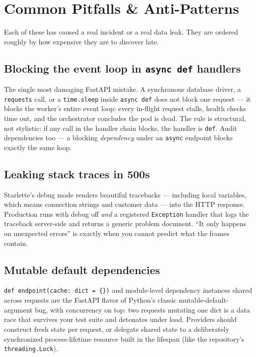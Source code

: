 \section{Common Pitfalls \& Anti-Patterns}
\label{sec:ch6-pitfalls}

Each of these has caused a real incident or a real data leak. They are
ordered roughly by how expensive they are to discover late.

\subsection*{Blocking the event loop in \texttt{async def} handlers}
The single most damaging FastAPI mistake. A synchronous database driver, a
\texttt{requests} call, or a \texttt{time.sleep} inside \texttt{async def}
does not block one request --- it blocks the worker's entire event loop:
every in-flight request stalls, health checks time out, and the orchestrator
concludes the pod is dead. The rule is structural, not stylistic: if any call
in the handler chain blocks, the handler is \texttt{def}. Audit dependencies
too --- a blocking \emph{dependency} under an \texttt{async} endpoint blocks
exactly the same loop.

\subsection*{Leaking stack traces in 500s}
Starlette's debug mode renders beautiful tracebacks --- including local
variables, which means connection strings and customer data --- into the HTTP
response. Production runs with debug off \emph{and} a registered
\texttt{Exception} handler that logs the traceback server-side and returns a
generic problem document. ``It only happens on unexpected errors'' is exactly
when you cannot predict what the frames contain.

\subsection*{Mutable default dependencies}
\texttt{def endpoint(cache: dict = \{\})} and module-level dependency
instances shared across requests are the FastAPI flavor of Python's classic
mutable-default-argument bug, with concurrency on top: two requests mutating
one dict is a data race that survives your test suite and detonates under
load. Providers should construct fresh state per request, or delegate
shared state to a deliberately synchronized process-lifetime resource built
in the lifespan (like the repository's \texttt{threading.Lock}).

